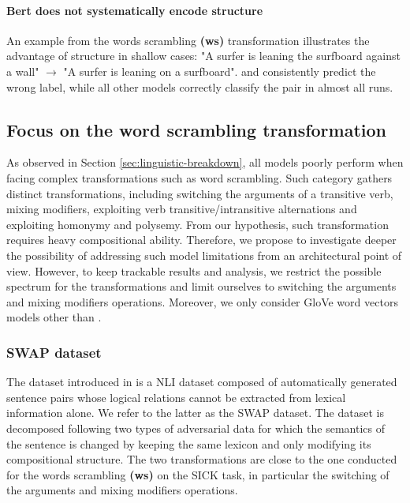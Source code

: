 \paragraph{Bert does not systematically encode structure}

An example from the words scrambling \textbf{(ws)} transformation illustrates the advantage of structure in shallow cases: "A surfer is leaning the surfboard against a wall" $\rightarrow$ "A surfer is leaning on a surfboard". \cls and \bow consistently predict the wrong label, while all other models correctly classify the pair in almost all runs. 




\FloatBarrier
\subsection{Focus on the word scrambling transformation}

As observed in Section \ref{sec:linguistic-breakdown}, all models poorly perform when facing complex transformations such as word scrambling. Such category gathers distinct transformations, including switching the arguments of a transitive verb, mixing modifiers, exploiting verb transitive/intransitive alternations and exploiting homonymy and polysemy. From our hypothesis, such transformation requires heavy compositional ability. Therefore, we propose to investigate deeper the possibility of addressing such model limitations from an architectural point of view. However, to keep trackable results and analysis, we restrict the possible spectrum for the transformations and limit ourselves to switching the arguments and mixing modifiers operations. Moreover, we only consider GloVe word vectors models other than \bert.

\subsubsection{SWAP dataset}

The dataset introduced in \textcite{nie_19b} is a NLI dataset composed of automatically generated sentence pairs whose logical relations cannot be extracted from lexical information alone. We refer to the latter as the SWAP dataset. The dataset is decomposed following two types of adversarial data for which the semantics of the sentence is changed by keeping the same lexicon and only modifying its compositional structure. The two transformations are close to the one conducted for the words scrambling \textbf{(ws)} on the SICK task, in particular the switching of the arguments and mixing modifiers operations.

